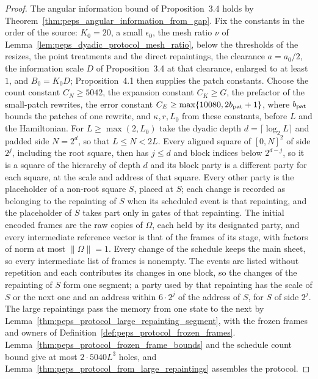\begin{proof}\leanok
    The angular information bound of Proposition~3.4 holds by
    Theorem~\ref{thm:peps_angular_information_from_gap}. Fix the constants in
    the order of the source: $K_0=20$, a small $\epsilon_0$, the mesh ratio
    $\nu$ of Lemma~\ref{lem:peps_dyadic_protocol_mesh_ratio}, below the
    thresholds of the resizes, the point treatments and the direct repaintings, the clearance $a=a_0/2$, the information scale $D$
    of Proposition~3.4 at that clearance, enlarged to at least $1$, and
    $B_0=K_0D$; Proposition~4.1 then supplies the patch constants. Choose
    the count constant $C_N\ge5042$, the expansion constant $C_K\ge G$, the
    prefactor of the small-patch rewrites, the error constant
    $C_E\ge\max\{10080,2b_{\rm pat}+1\}$, where $b_{\rm pat}$ bounds the patches
    of one rewrite, and $\kappa,r,L_0$ from these constants, before $L$ and the
    Hamiltonian. For $L\ge\max(2,L_0)$ take the dyadic depth
    $d=\lceil\log_2L\rceil$ and padded side $N=2^d$, so that $L\le N<2L$.
    Every aligned square of $[0,N]^2$ of side $2^j$, including the root
    square, then has $j\le d$ and block indices below $2^{d-j}$, so it is a
    square of the hierarchy of depth $d$ and its block party is a different
    party for each square, at the scale and address of that square. Every
    other party is the placeholder of a non-root square $S$, placed at $S$;
    each change is recorded as belonging to the repainting of $S$ when its
    scheduled event is that repainting, and the placeholder of $S$ takes part
    only in gates of that repainting. The initial encoded frames are the raw
    copies of $\Omega$, each held by its designated party, and every
    intermediate reference vector is that of the frames of its stage, with
    factors of norm at most $\lVert\Omega\rVert=1$. Every change of the schedule
    keeps the main sheet, so every intermediate list of frames is nonempty. The
    events are listed without repetition
    and each contributes its changes in one block, so the changes of the
    repainting of $S$ form one segment; a party used by that repainting has the
    scale of $S$ or the next one and an address within $6\cdot2^j$ of the
    address of $S$, for $S$ of side $2^j$. The
    large repaintings pass the memory from one state to the next by
    Lemma~\ref{thm:peps_protocol_large_repainting_segment}, with the
    frozen frames and owners of Definition~\ref{def:peps_protocol_frozen_frames}.
    Lemma~\ref{thm:peps_protocol_frozen_frame_bounds} and the schedule
    count bound give at most $2\cdot5040L^3$ holes, and
    Lemma~\ref{thm:peps_protocol_from_large_repaintings} assembles the protocol.
\end{proof}
